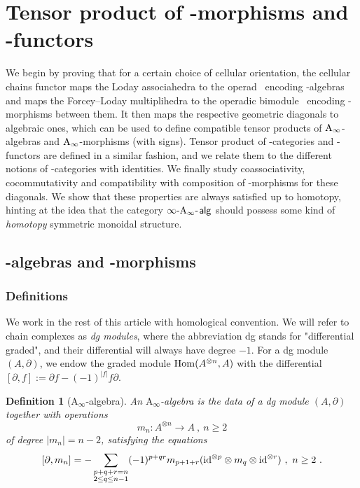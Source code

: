 \documentclass[10pt]{amsart}
\newtheorem{definition}{Definition}[section]
\theoremstyle{remark}
\begin{document}

\section{Tensor product of \Ainf -morphisms and \Ainf -functors}
\label{sec:IV}

We begin by proving that for a certain choice of cellular orientation, the cellular chains functor maps the Loday associahedra to the operad \Ainf\ encoding \Ainf -algebras and maps the Forcey--Loday multiplihedra to the operadic bimodule \Minf\ encoding \Ainf -morphisms between them.
It then maps the respective geometric diagonals to algebraic ones, which can be used to define compatible tensor products of $\mathrm{A}_\infty$-algebras and $\mathrm{A}_\infty$-morphisms (with signs). 
Tensor product of \Ainf -categories and \Ainf -functors are defined in a similar fashion, and we relate them to the different notions of \Ainf -categories with identities.
We finally study coassociativity, cocommutativity and compatibility with composition of \Ainf -morphisms for these diagonals. 
We show that these properties are always satisfied up to homotopy, hinting at the idea that the category $\infty\text{-}\mathrm{A}_\infty\text{-\hspace{1pt}}\mathsf{alg}$ should possess some kind of \textit{homotopy} symmetric monoidal structure.

\subsection{\Ainf -algebras and \Ainf -morphisms} \label{ss:ainf-alg-ainf-morph}

\subsubsection{Definitions}

We work in the rest of this article with homological convention. 
We will refer to chain complexes as \emph{dg modules}, where the abbreviation dg stands for "differential graded", and their differential will always have degree $-1$.
For a dg module $(A,\partial)$, we endow the graded module $\mathrm{Hom}(A^{\otimes n}, A)$ with the differential $[\partial,f] := \partial f - (-1)^{|f|}f\partial$.

\begin{definition}[$\mathrm{A}_\infty$-algebra] \label{def:ainf-alg} An \emph{$\mathrm{A}_\infty$-algebra} is the data of a dg module $(A,\partial)$ together with operations \[ m_n : A^{\otimes n} \to A \ , \ n \geq 2 \] of degree $|m_n|=n-2$, satisfying the equations 
\[ [ \partial , m_n ] = - \sum_{\substack{p+q+r=n \\ 2 \leq q \leq n-1}} (-1)^{p+qr}m_{p+1+r}(\mathrm{id}^{\otimes p} \otimes m_q \otimes \mathrm{id}^{\otimes r}) \ , \ n\geq 2 \ . \]
\end{definition}
\end{document}
